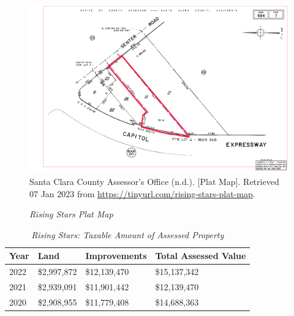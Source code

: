 \begin{figure}[hbt]
    \caption[Rising Stars Plat Map]{\textit{Rising Stars Plat Map}}\label{fig:rising-stars-plat-map}
    \includegraphics[width=\textwidth]{Assessor-Info/rising-stars-plat-map-494-01}\\ %
    \footnotesize{Santa Clara County Assessor's Office (n.d.). [Plat Map]. Retrieved 07 Jan 2023 from  \url{https://tinyurl.com/rising-stars-plat-map}}.
\end{figure}

\begin{table}[hbt]
  \SingleSpacing%
  \caption[Rising Stars: Taxable Amount of Assessed Propery]{\textit{Rising Stars: Taxable Amount of Assessed Property}}\label{tab:rising-stars-taxable-amount}
  \begin{tabular}{llll}
    \toprule
    Year & Land        & Improvements & Total Assessed Value \\
    \midrule
    2022 & \$2,997,872 & \$12,139,470 & \$15,137,342 \\
    2021 & \$2,939,091 & \$11,901,442 & \$12,139,470 \\
    2020 & \$2,908,955 & \$11,779,408 & \$14,688,363 \\
    \bottomrule
  \end{tabular}
\end{table}

